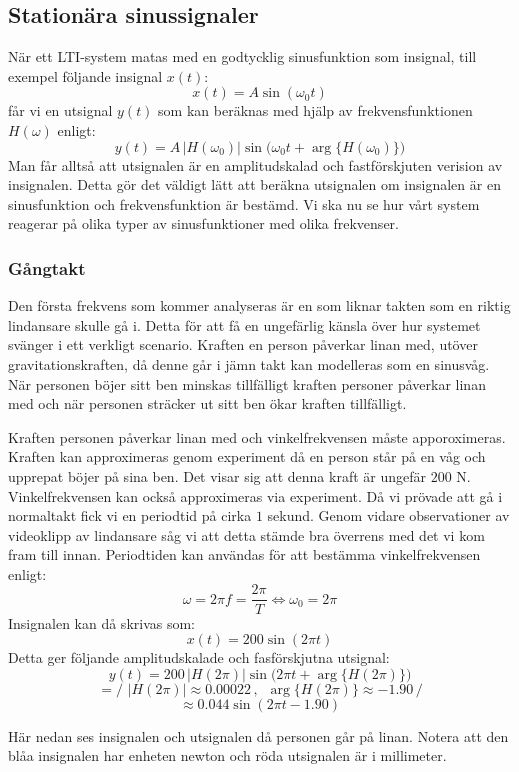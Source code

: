 \subsection{Stationära sinussignaler}
När ett LTI-system matas med en godtycklig sinusfunktion som insignal, till exempel följande insignal $x(t)$:
$$x(t)=A\sin(\omega_0t)$$
får vi en utsignal $y(t)$ som kan beräknas med hjälp av frekvensfunktionen $H(\omega)$ enligt:
$$y(t)=A\,\big|H(\omega_0)\big|\sin\big(\omega_0t+\arg\big\{H(\omega_0)\big\}\big)$$
Man får alltså att utsignalen är en amplitudskalad och fastförskjuten verision av insignalen.
Detta gör det väldigt lätt att beräkna utsignalen om insignalen är en sinusfunktion och frekvensfunktion är bestämd. Vi ska nu se hur vårt system reagerar på olika typer av sinusfunktioner med olika frekvenser.

\subsubsection{Gångtakt}
Den första frekvens som kommer analyseras är en som liknar takten som en riktig lindansare skulle gå i. Detta för att få en ungefärlig känsla över hur systemet svänger i ett verkligt scenario. Kraften en person påverkar linan med, utöver gravitationskraften, då denne går i jämn takt kan modelleras som en sinusvåg. När personen böjer sitt ben minskas tillfälligt kraften personer påverkar linan med och när personen sträcker ut sitt ben ökar kraften tillfälligt.

Kraften personen påverkar linan med och vinkelfrekvensen måste apporoximeras. Kraften kan approximeras genom experiment då en person står på en våg och upprepat böjer på sina ben. Det visar sig att denna kraft är ungefär $200$ N. Vinkelfrekvensen kan också approximeras via experiment. Då vi prövade att gå i normaltakt fick vi en periodtid på cirka $1$ sekund. Genom vidare observationer av videoklipp av lindansare såg vi att detta stämde bra överrens med det vi kom fram till innan. Periodtiden kan användas för att bestämma vinkelfrekvensen enligt:
$$\omega=2\pi f= \dfrac{2\pi}{T} \Longleftrightarrow \omega_0 = 2\pi$$
Insignalen kan då skrivas som:
$$x(t)=200\sin(2\pi t)$$
Detta ger följande amplitudskalade och fasförskjutna utsignal:
$$y(t)=200\,\big|H(2\pi)\big|\sin\big(2\pi t+\arg\big\{H(2\pi)\big\}\big)$$
$$=\bigg/ \,\,\big|H(2\pi)\big|\approx 0.00022 \,,\,\,\, \arg\big\{H(2\pi)\big\}\approx -1.90  \,\bigg/$$
$$\approx 0.044\sin(2\pi t - 1.90)$$

\newpage
Här nedan ses insignalen och utsignalen då personen går på linan. Notera att den blåa insignalen har enheten newton och röda utsignalen är i millimeter. 

